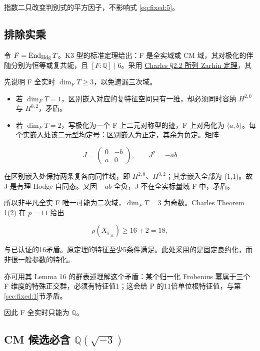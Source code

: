 \documentclass[11pt,a4paper,oneside]{ctexart}
\theoremstyle{cnplain}
\theoremstyle{definition}
\theoremstyle{remark}
\newcommand{\tightlist}{\setlength{\itemsep}{0pt}\setlength{\parskip}{0pt}}
\numberwithin{equation}{section}
\begin{document}
指数二只改变判别式的平方因子，不影响式 \eqref{eq:fixed:5}。


\subsection{排除实乘}\label{sec:fixed:2}

令 \(F=\operatorname{End}_{\rm Hdg}T\)。K3 型的标准定理给出：F 是全实域或 CM 域，其对极化的伴随分别为恒等或复共轭，且 \([F:\mathbb Q]\mid6\)。采用 \href{https://www.imo.universite-paris-saclay.fr/~francois.charles/Picard.pdf}{Charles §2.2 所列 Zarhin 定理}，其

先说明 F 全实时 \(\dim_FT\ge3\)，以免遗漏三次域。

\begin{itemize}
\tightlist
\item
  若 \(\dim_FT=1\)，区别嵌入对应的复特征空间只有一维，却必须同时容纳 \(H^{2,0}\) 与 \(H^{0,2}\)，矛盾。
\item
  若 \(\dim_FT=2\)，写极化为一个 F 上二元对称型的迹，F 上对角化为 \(\langle a,b\rangle\)。每个实嵌入处该二元型均定号：区别嵌入为正定，其余为负定。矩阵
\end{itemize}

\begin{equation}
J=\begin{pmatrix}0&-b\\a&0\end{pmatrix},\qquad J^2=-ab
\end{equation}

在区别嵌入处保持两条复各向同性线，即 \(H^{2,0}\)、\(H^{0,2}\)；其余嵌入全部为 (1,1)。故 J 是有理 Hodge 自同态。又因 \(-ab\) 全负，J 不在全实标量域 F 中，矛盾。

所以非平凡全实 F 唯一可能为二次域，\(\dim_FT=3\) 为奇数。Charles Theorem 1(2) 在 \(p=11\) 给出

\begin{equation}
\rho(X_{\overline{\mathbb F}_{11}})\ge16+2=18,
\end{equation}

与已认证的16矛盾。原定理的特征至少5条件满足。此处采用的是固定良约化，而非很一般参数的特化。

亦可用其 Lemma 16 的群表述理解这个矛盾：某个归一化 Frobenius 幂属于三个 F 维度的特殊正交群，必须有特征值1；这会给 P 的11倍单位根特征值，与第\ref{sec:fixed:1}节矛盾。

因此 F 全实时只能为 \(\mathbb Q\)。


\subsection{\texorpdfstring{CM 候选必含 \(\mathbb Q(\sqrt{-3})\)}{CM 候选必含 \textbackslash mathbb Q(\textbackslash sqrt\{-3\})}}\label{sec:fixed:3}
\end{document}
